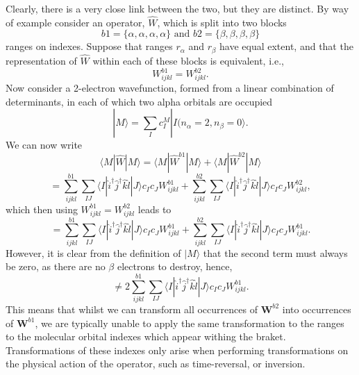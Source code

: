 \documentclass[12pt]{article}
\begin{document}
\noindent Clearly, there is a very close link between the two, but they are distinct. By way of
example consider an operator, $\hat{W}$, which is split into two blocks 
\begin{equation*}
b1 = \{ \alpha,\alpha,\alpha,\alpha \} 
\text { \ \ \ \ and \ \ \ }  
b2 = \{ \beta,\beta,\beta,\beta \} 
\end{equation*}
ranges on indexes. Suppose that ranges $r_{\alpha}$ and $r_{\beta}$ have equal extent, and that 
the representation of $\hat{W}$ within each of these blocks is equivalent, i.e.,
\begin{equation}
W^{b1}_{ijkl}= W^{b2}_{ijkl}.
\end{equation}
Now consider a 2-electron wavefunction, formed from a linear combination of determinants, in each of which 
two alpha orbitals are occupied
\begin{equation}
|M\rangle = \sum_{I} c_{I}^{M} | I (n_{\alpha} = 2 , n_{\beta} = 0 \rangle.
\end{equation}
We can now write
\begin{equation*}
\langle M | \hat{W} |M\rangle = \langle M | \hat{W}^{b1} |M\rangle  + \langle M | \hat{W}^{b2} |M\rangle 
\end{equation*}
\begin{equation*}
= 
\sum_{ijkl}^{b1} \sum_{IJ}\langle I |\hat{i}^{\dagger}\hat{j}^{\dagger}\hat{k}\hat{l} | J \rangle c_{I}c_{J} W^{b1}_{ijkl}+
\sum_{ijkl}^{b2} \sum_{IJ}\langle I |\hat{i}^{\dagger}\hat{j}^{\dagger}\hat{k}\hat{l} | J \rangle c_{I}c_{J} W^{b2}_{ijkl},
\end{equation*}
which then using $W^{b1}_{ijkl}= W^{b2}_{ijkl}$ leads to 
\begin{equation*}
= 
\sum_{ijkl}^{b1} \sum_{IJ}\langle I |\hat{i}^{\dagger}\hat{j}^{\dagger}\hat{k}\hat{l} | J \rangle c_{I}c_{J} W^{b1}_{ijkl}+
\sum_{ijkl}^{b2} \sum_{IJ}\langle I |\hat{i}^{\dagger}\hat{j}^{\dagger}\hat{k}\hat{l} | J \rangle c_{I}c_{J} W^{b1}_{ijkl}.
\end{equation*}
However, it is clear from the definition of $|M\rangle$ that the second term must always be zero, as there are 
no $\beta$ electrons to destroy, hence,
\begin{equation*}
\neq 2 \sum_{ijkl}^{b1} \sum_{IJ}\langle I |\hat{i}^{\dagger}\hat{j}^{\dagger}\hat{k}\hat{l} | J \rangle c_{I}c_{J} W^{b1}_{ijkl}.
\end{equation*}
This means that whilst we can transform all occurrences of $\mathbf{W}^{b2}$ into occurrences of $\mathbf{W}^{b1}$, we are typically unable to apply
the same transformation to the ranges to the molecular orbital indexes which appear withing the braket. Transformations of
these indexes only arise when performing transformations on the physical action of the operator, such as time-reversal, or inversion. \\
\end{document}
